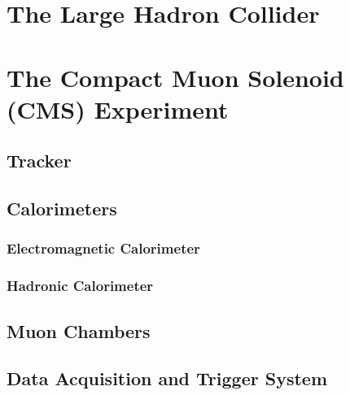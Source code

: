 \section{The Large Hadron Collider} 
\section{The Compact Muon Solenoid (CMS) Experiment}
\subsection{Tracker} 
\subsection{Calorimeters} 
\subsubsection{Electromagnetic Calorimeter} 
\subsubsection{Hadronic Calorimeter} 
\subsection{Muon Chambers} 
\subsection{Data Acquisition and Trigger System} 
